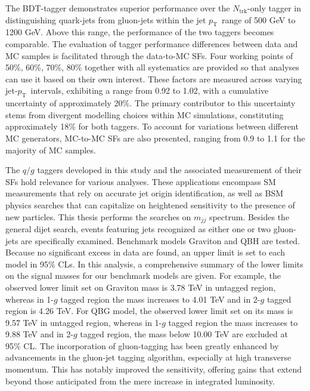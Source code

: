 \documentclass[UTF8,12pt]{ctexart}
\numberwithin{equation}{section}
\newcommand{\ntrk}{\ensuremath{N_{\mathrm{trk}}}\xspace}
\newcommand{\pt}{\ensuremath{p_{\mathrm{T}}\xspace}}
\def\mjj{$m_{jj}$ }
\begin{document}
The BDT-tagger demonstrates superior performance over the \ntrk-only tagger in distinguishing quark-jets from gluon-jets within the jet \pt~range of 500 GeV to 1200 GeV. Above this range, the performance of the two taggers becomes comparable. The evaluation of tagger performance differences between data and MC samples is facilitated through the data-to-MC SFs. Four working points of 50\%, 60\%, 70\%, 80\% together with all systematics are provided so that analyses can use it based on their own interest. These factors are measured across varying jet-\pt~intervals, exhibiting a range from 0.92 to 1.02, with a cumulative uncertainty of approximately 20\%. The primary contributor to this uncertainty stems from divergent modelling choices within MC simulations, constituting approximately 18\% for both taggers. To account for variations between different MC generators, MC-to-MC SFs are also presented, ranging from 0.9 to 1.1 for the majority of MC samples.

The $q/g$ taggers developed in this study and the associated measurement of their SFs hold relevance for various analyses. These applications encompass SM measurements that rely on accurate jet origin identification, as well as BSM physics searches that can capitalize on heightened sensitivity to the presence of new particles. This thesis performs the searches on \mjj spectrum. Besides the general dijet search, events featuring jets recognized as either one or two gluon-jets are specifically examined. Benchmark models Graviton and QBH are tested. Because no significant excess in data are found, an upper limit is set to each model in 95\% CLs. In this analysis, a comprehensive summary of the lower limits on the signal masses for our benchmark models are given. For example, the observed lower limit set on Graviton mass is 3.78 TeV in untagged region, whereas in 1-$g$ tagged region the mass increases to 4.01 TeV and in 2-$g$ tagged region is 4.26 TeV. For QBG model,  the observed lower limit set on its mass is 9.57 TeV in untagged region, whereas in 1-$g$ tagged region the mass increases to 9.88 TeV and in 2-$g$ tagged region, the mass below 10.00 TeV are excluded at 95\% CL. The incorporation of gluon-tagging has been greatly enhanced by advancements in the gluon-jet tagging algorithm, especially at high transverse momentum. This has notably improved the sensitivity, offering gains that extend beyond those anticipated from the mere increase in integrated luminosity.
\end{document}
